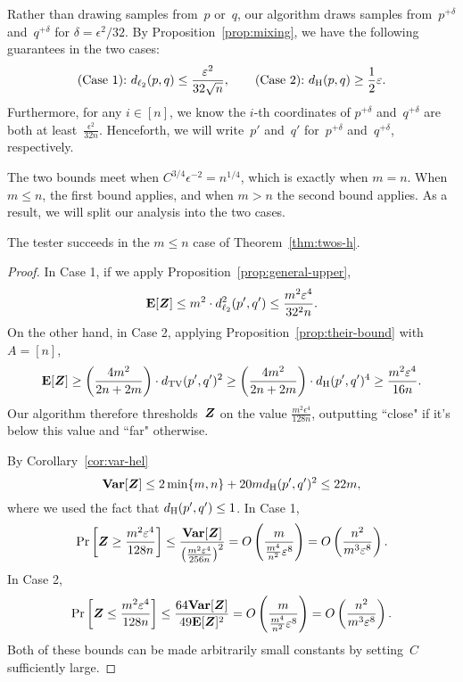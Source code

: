 Rather than drawing samples from~$p$ or~$q$,
our algorithm draws samples from~$p^{+\delta}$ and~$q^{+\delta}$
for $\delta = \epsilon^2/32$.
By Proposition~\ref{prop:mixing}, we have the following guarantees in the two cases:
\begin{equation*}
\text{(Case 1):}~d_{\ell_2}(p,q) \leq \frac{\varepsilon^2}{32 \sqrt{n}},
\qquad
\text{(Case 2):}~d_{\mathrm {H}}(p,q) \geq \frac{1}{2} \varepsilon.
\end{equation*}
Furthermore, for any $i \in [n]$, we know the $i$-th coordinates of $p^{+\delta}$ and~$q^{+\delta}$ are both at least~$\frac{\epsilon^2}{32n}$.
Henceforth, we will write~$p'$ and~$q'$ for~$p^{+\delta}$ and~$q^{+\delta}$, respectively.


The two bounds meet when $C^{3/4}\epsilon^{-2} = n^{1/4}$,
which is exactly when $m = n$.
When $m \leq n$, the first bound applies, and when $m > n$ the second bound applies.
As a result, we will split our analysis into the two cases.

\begin{lemma}
The tester succeeds in the $m \leq n$ case of Theorem~\ref{thm:twos-h}.
\end{lemma}
\begin{proof}
In Case 1, if we apply Proposition~\ref{prop:general-upper},
\begin{equation*}
\mbox{\bf E}[\boldsymbol{Z}]
\leq m^2 \cdot  d_{\ell_2}^2(p',q')
\leq \frac{m^2 \varepsilon^4}{32^2 n}.
\end{equation*}
On the other hand, in Case 2, applying Proposition~\ref{prop:their-bound} with $A = [n]$,
\begin{equation*}
\mbox{\bf E}[\boldsymbol{Z}]
\geq \left(\frac{4m^2}{2n+2m}\right) \cdot d_{\mathrm {TV}}(p',q')^2
\geq \left(\frac{4m^2}{2n+2m}\right) \cdot d_{\mathrm {H}}(p',q')^4
\geq \frac{m^2\varepsilon^4}{16n}.
\end{equation*}
Our algorithm therefore thresholds~$\boldsymbol{Z}$ on the value $ \frac{m^2\epsilon^4}{128n}$,
outputting ``close" if it's below this value and ``far" otherwise.

By Corollary~\ref{cor:var-hel}
\begin{equation*}
\mbox{\bf Var}[\boldsymbol{Z}] \leq 2 \min\{m, n\} +  20m d_{\mathrm {H}}(p',q')^2
\leq 22m,
\end{equation*}
where we used the fact that $d_{\mathrm {H}}(p',q') \leq 1$.
In Case 1,
\begin{equation*}
\Pr\left[\boldsymbol{Z} \geq \frac{m^2\varepsilon^4}{128n}\right]
\leq \frac{\mbox{\bf Var}[\boldsymbol{Z}]}{\left(\frac{m^2\varepsilon^4}{256n}\right)^2}
= O\left(\frac{m}{\frac{m^4}{n^2} \varepsilon^8}\right)
= O\left(\frac{n^2}{m^3 \varepsilon^8}\right).
\end{equation*}
In Case 2,
\begin{equation*}
\Pr\left[\boldsymbol{Z} \leq \frac{m^2\varepsilon^4}{128n}\right]
\leq \frac{64 \mbox{\bf Var}[\boldsymbol{Z}]}{49\mbox{\bf E}[\boldsymbol{Z}]^2}
= O\left(\frac{m}{\frac{m^4}{n^2} \varepsilon^8}\right)
= O\left(\frac{n^2}{m^3 \varepsilon^8}\right).
\end{equation*}
Both of these bounds can be made arbitrarily small constants by setting~$C$ sufficiently large.
\end{proof}

